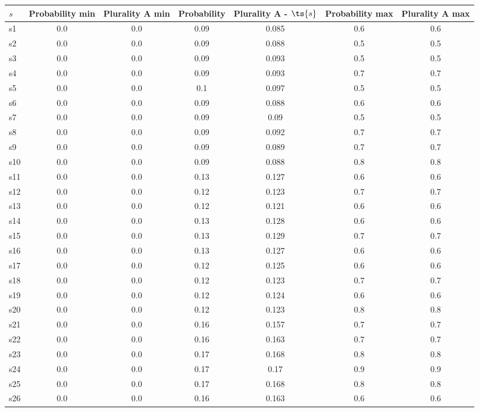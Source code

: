 \documentclass{article}
\begin{document}
\noindent\begin{tabular}{|l|c|c|c|c|c|c|}
\hline
$s$& Probability min & Plurality A min & Probability & Plurality A - $\ts{s}$ & Probability max & Plurality A max\\
\hline
s1 &0.0 & 0.0 & 0.09 & 0.085 & 0.6 & 0.6\\
\hline
s2 &0.0 & 0.0 & 0.09 & 0.088 & 0.5 & 0.5\\
\hline
s3 &0.0 & 0.0 & 0.09 & 0.093 & 0.5 & 0.5\\
\hline
s4 &0.0 & 0.0 & 0.09 & 0.093 & 0.7 & 0.7\\
\hline
s5 &0.0 & 0.0 & 0.1 & 0.097 & 0.5 & 0.5\\
\hline
s6 &0.0 & 0.0 & 0.09 & 0.088 & 0.6 & 0.6\\
\hline
s7 &0.0 & 0.0 & 0.09 & 0.09 & 0.5 & 0.5\\
\hline
s8 &0.0 & 0.0 & 0.09 & 0.092 & 0.7 & 0.7\\
\hline
s9 &0.0 & 0.0 & 0.09 & 0.089 & 0.7 & 0.7\\
\hline
s10 &0.0 & 0.0 & 0.09 & 0.088 & 0.8 & 0.8\\
\hline
s11 &0.0 & 0.0 & 0.13 & 0.127 & 0.6 & 0.6\\
\hline
s12 &0.0 & 0.0 & 0.12 & 0.123 & 0.7 & 0.7\\
\hline
s13 &0.0 & 0.0 & 0.12 & 0.121 & 0.6 & 0.6\\
\hline
s14 &0.0 & 0.0 & 0.13 & 0.128 & 0.6 & 0.6\\
\hline
s15 &0.0 & 0.0 & 0.13 & 0.129 & 0.7 & 0.7\\
\hline
s16 &0.0 & 0.0 & 0.13 & 0.127 & 0.6 & 0.6\\
\hline
s17 &0.0 & 0.0 & 0.12 & 0.125 & 0.6 & 0.6\\
\hline
s18 &0.0 & 0.0 & 0.12 & 0.123 & 0.7 & 0.7\\
\hline
s19 &0.0 & 0.0 & 0.12 & 0.124 & 0.6 & 0.6\\
\hline
s20 &0.0 & 0.0 & 0.12 & 0.123 & 0.8 & 0.8\\
\hline
s21 &0.0 & 0.0 & 0.16 & 0.157 & 0.7 & 0.7\\
\hline
s22 &0.0 & 0.0 & 0.16 & 0.163 & 0.7 & 0.7\\
\hline
s23 &0.0 & 0.0 & 0.17 & 0.168 & 0.8 & 0.8\\
\hline
s24 &0.0 & 0.0 & 0.17 & 0.17 & 0.9 & 0.9\\
\hline
s25 &0.0 & 0.0 & 0.17 & 0.168 & 0.8 & 0.8\\
\hline
s26 &0.0 & 0.0 & 0.16 & 0.163 & 0.6 & 0.6\\
\hline

\end{tabular}
\end{document}
